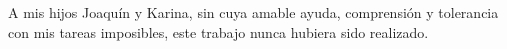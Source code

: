
\begin{acknowledgements}

A mis hijos Joaquín y Karina, sin cuya amable ayuda, comprensión y tolerancia con mis tareas imposibles, este trabajo nunca hubiera sido realizado.\\


\end{acknowledgements}




